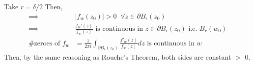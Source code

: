 \documentclass{article}
\begin{document}
Take $r = \delta/2$ Then, 
\begin{align*}
  \implies& \left|f_w(z_0)\right| > 0\;\;\forall z \in \partial B_{\epsilon}(z_0) \\
  \implies& \frac{f_w'(z)}{f_w(z)} \text{ is continuous in } z \in \partial B_{\epsilon}(z_0) \text{ i.e. } B_r(w_0) \\
  \text{\# zeroes of } f_w &= \frac{1}{2\pi i} \int_{\partial B_{\epsilon}(z_0)} \frac{f'_w(z)}{f_w(z)} dz \text{ is continuous in } w
\end{align*}
Then, by the same reasoning as Rouche's Theorem, both sides are constant $>$ 0.
\end{document}
